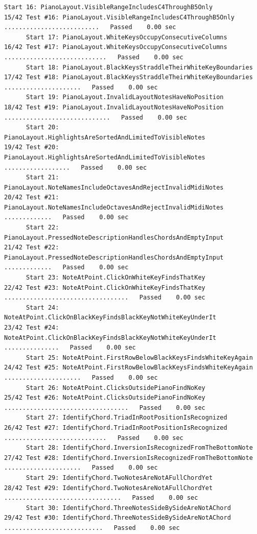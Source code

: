 \documentclass[10pt,letterpaper]{article}
\begin{document}
\begin{lstlisting}[basicstyle=\ttfamily\tiny]
      Start 16: PianoLayout.VisibleRangeIncludesC4ThroughB5Only
15/42 Test #16: PianoLayout.VisibleRangeIncludesC4ThroughB5Only ..........................   Passed    0.00 sec
      Start 17: PianoLayout.WhiteKeysOccupyConsecutiveColumns
16/42 Test #17: PianoLayout.WhiteKeysOccupyConsecutiveColumns ............................   Passed    0.00 sec
      Start 18: PianoLayout.BlackKeysStraddleTheirWhiteKeyBoundaries
17/42 Test #18: PianoLayout.BlackKeysStraddleTheirWhiteKeyBoundaries .....................   Passed    0.00 sec
      Start 19: PianoLayout.InvalidLayoutNotesHaveNoPosition
18/42 Test #19: PianoLayout.InvalidLayoutNotesHaveNoPosition .............................   Passed    0.00 sec
      Start 20: PianoLayout.HighlightsAreSortedAndLimitedToVisibleNotes
19/42 Test #20: PianoLayout.HighlightsAreSortedAndLimitedToVisibleNotes ..................   Passed    0.00 sec
      Start 21: PianoLayout.NoteNamesIncludeOctavesAndRejectInvalidMidiNotes
20/42 Test #21: PianoLayout.NoteNamesIncludeOctavesAndRejectInvalidMidiNotes .............   Passed    0.00 sec
      Start 22: PianoLayout.PressedNoteDescriptionHandlesChordsAndEmptyInput
21/42 Test #22: PianoLayout.PressedNoteDescriptionHandlesChordsAndEmptyInput .............   Passed    0.00 sec
      Start 23: NoteAtPoint.ClickOnWhiteKeyFindsThatKey
22/42 Test #23: NoteAtPoint.ClickOnWhiteKeyFindsThatKey ..................................   Passed    0.00 sec
      Start 24: NoteAtPoint.ClickOnBlackKeyFindsBlackKeyNotWhiteKeyUnderIt
23/42 Test #24: NoteAtPoint.ClickOnBlackKeyFindsBlackKeyNotWhiteKeyUnderIt ...............   Passed    0.00 sec
      Start 25: NoteAtPoint.FirstRowBelowBlackKeysFindsWhiteKeyAgain
24/42 Test #25: NoteAtPoint.FirstRowBelowBlackKeysFindsWhiteKeyAgain .....................   Passed    0.00 sec
      Start 26: NoteAtPoint.ClicksOutsidePianoFindNoKey
25/42 Test #26: NoteAtPoint.ClicksOutsidePianoFindNoKey ..................................   Passed    0.00 sec
      Start 27: IdentifyChord.TriadInRootPositionIsRecognized
26/42 Test #27: IdentifyChord.TriadInRootPositionIsRecognized ............................   Passed    0.00 sec
      Start 28: IdentifyChord.InversionIsRecognizedFromTheBottomNote
27/42 Test #28: IdentifyChord.InversionIsRecognizedFromTheBottomNote .....................   Passed    0.00 sec
      Start 29: IdentifyChord.TwoNotesAreNotAFullChordYet
28/42 Test #29: IdentifyChord.TwoNotesAreNotAFullChordYet ................................   Passed    0.00 sec
      Start 30: IdentifyChord.ThreeNotesSideBySideAreNotAChord
29/42 Test #30: IdentifyChord.ThreeNotesSideBySideAreNotAChord ...........................   Passed    0.00 sec

\end{lstlisting}
\end{document}

